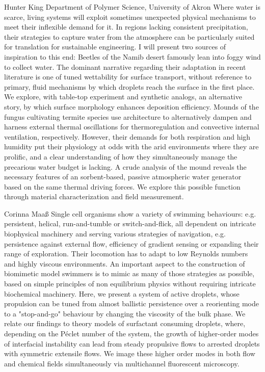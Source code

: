 \documentclass{article}
\begin{document}
{Hunter King}
{Department of Polymer Science, University of Akron}
{Where water is scarce, living systems will exploit sometimes unexpected physical
mechanisms to meet their inflexible demand for it. In regions lacking consistent
precipitation, their strategies to capture water from the atmosphere can be particularly
suited for translation for sustainable engineering. I will present two sources of
inspiration to this end: Beetles of the Namib desert famously lean into foggy wind to
collect water. The dominant narrative regarding their adaptation in recent literature is
one of tuned wettability for surface transport, without reference to primary, fluid
mechanisms by which droplets reach the surface in the first place.  We explore, with
table-top experiment and synthetic analogs, an alternative story, by which surface
morphology enhances deposition efficiency. Mounds of the fungus cultivating termite
species use architecture to alternatively dampen and harness external thermal oscillations
for thermoregulation and convective internal ventilation, respectively. However, their
demands for both respiration and high humidity put their physiology at odds with the arid
environments where they are prolific, and a clear understanding of how they simultaneously
manage the precarious water budget is lacking. A crude analysis of the mound reveals the
necessary features of an sorbent-based, passive atmospheric water generator based on the
same thermal driving forces. We explore this possible function through material
characterization and field measurement.}

{Corinna Maa\ss}
{}
{Single cell organisms show a variety of swimming behaviours: e.g. persistent,
helical, run-and-tumble or switch-and-flick, all dependent on intricate biophysical
machinery and serving various strategies of navigation, e.g. persistence against external
flow, efficiency of gradient sensing or expanding their range of exploration. Their
locomotion has to adapt to low Reynolds numbers and  highly viscous environments. An
important aspect to the construction of biomimetic model swimmers is to mimic as many of
those strategies as possible, based on simple principles of non equilibrium physics
without requiring intricate biochemical machinery. Here, we present a system of active
droplets, whose propulsion can be tuned from almost ballistic persistence over a
reorienting mode to a "stop-and-go" behaviour by changing the viscosity of the bulk phase.
We relate our findings to theory models of surfactant consuming droplets, where, depending
on the Péclet number of the system, the growth of higher-order modes of interfacial
instability can lead from steady propulsive flows to arrested droplets with symmetric
extensile flows. We image these higher order modes in both flow and chemical fields
simultaneously via multichannel fluorescent microscopy.}
\end{document}
